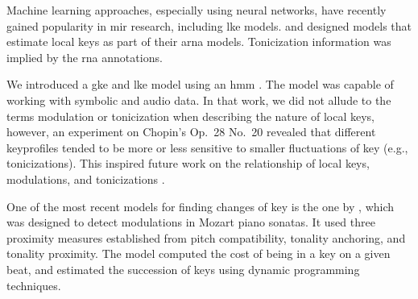 Machine learning approaches, especially using neural
networks, have recently gained popularity in \gls{mir}
research, including \gls{lke} models.
\textcite{chen2018functional, chen2019harmony} and
\textcite{micchi2020not} designed models that estimate local
keys as part of their \gls{arna} models. Tonicization
information was implied by the \gls{rna} annotations.

We introduced a \gls{gke} and \gls{lke} model using an
\gls{hmm} \parencite{napoleslopez2019keyfinding}. The model
was capable of working with symbolic and audio data. In that
work, we did not allude to the terms modulation or
tonicization when describing the nature of local keys,
however, an experiment on Chopin's Op.~28 No.~20 revealed
that different \gls{keyprofile}s tended to be more or less
sensitive to smaller fluctuations of key (e.g.,
tonicizations). This inspired future work on the
relationship of local keys, modulations, and tonicizations
\parencite{napoleslopez2020local}.

One of the most recent models for finding changes of key is
the one by \textcite{feisthauer2020estimating}, which was
designed to detect modulations in Mozart piano sonatas. It
used three proximity measures established from pitch
compatibility, tonality anchoring, and tonality proximity.
The model computed the cost of being in a key on a given
beat, and estimated the succession of keys using dynamic
programming techniques.
